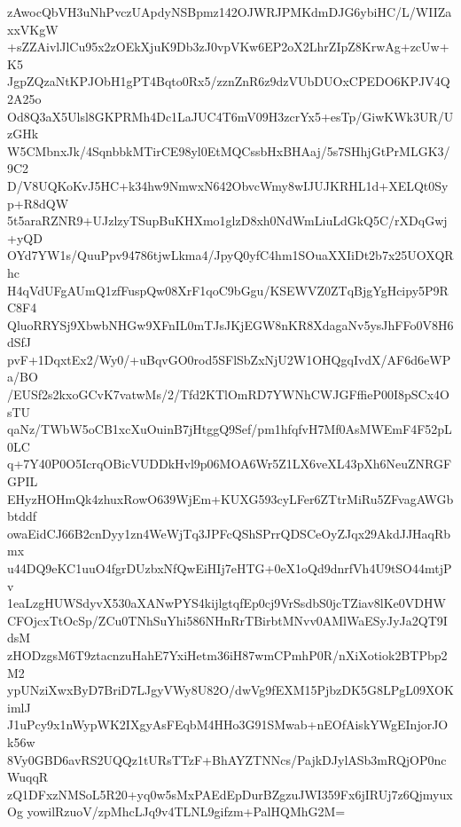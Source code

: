 zAwocQbVH3uNhPvczUApdyNSBpmz142OJWRJPMKdmDJG6ybiHC/L/WIIZaxxVKgW
+sZZAivlJlCu95x2zOEkXjuK9Db3zJ0vpVKw6EP2oX2LhrZIpZ8KrwAg+zcUw+K5
JgpZQzaNtKPJObH1gPT4Bqto0Rx5/zznZnR6z9dzVUbDUOxCPEDO6KPJV4Q2A25o
Od8Q3aX5Ulsl8GKPRMh4Dc1LaJUC4T6mV09H3zcrYx5+esTp/GiwKWk3UR/UzGHk
W5CMbnxJk/4SqnbbkMTirCE98yl0EtMQCssbHxBHAaj/5s7SHhjGtPrMLGK3/9C2
D/V8UQKoKvJ5HC+k34hw9NmwxN642ObvcWmy8wIJUJKRHL1d+XELQt0Syp+R8dQW
5t5araRZNR9+UJzlzyTSupBuKHXmo1glzD8xh0NdWmLiuLdGkQ5C/rXDqGwj+yQD
OYd7YW1s/QuuPpv94786tjwLkma4/JpyQ0yfC4hm1SOuaXXIiDt2b7x25UOXQRhc
H4qVdUFgAUmQ1zfFuspQw08XrF1qoC9bGgu/KSEWVZ0ZTqBjgYgHcipy5P9RC8F4
QluoRRYSj9XbwbNHGw9XFnIL0mTJsJKjEGW8nKR8XdagaNv5ysJhFFo0V8H6dSfJ
pvF+1DqxtEx2/Wy0/+uBqvGO0rod5SFlSbZxNjU2W1OHQgqIvdX/AF6d6eWPa/BO
/EUSf2s2kxoGCvK7vatwMs/2/Tfd2KTlOmRD7YWNhCWJGFffieP00I8pSCx4OsTU
qaNz/TWbW5oCB1xcXuOuinB7jHtggQ9Sef/pm1hfqfvH7Mf0AsMWEmF4F52pL0LC
q+7Y40P0O5IcrqOBicVUDDkHvl9p06MOA6Wr5Z1LX6veXL43pXh6NeuZNRGFGPIL
EHyzHOHmQk4zhuxRowO639WjEm+KUXG593cyLFer6ZTtrMiRu5ZFvagAWGbbtddf
owaEidCJ66B2cnDyy1zn4WeWjTq3JPFcQShSPrrQDSCeOyZJqx29AkdJJHaqRbmx
u44DQ9eKC1uuO4fgrDUzbxNfQwEiHIj7eHTG+0eX1oQd9dnrfVh4U9tSO44mtjPv
1eaLzgHUWSdyvX530aXANwPYS4kijlgtqfEp0cj9VrSsdbS0jcTZiav8lKe0VDHW
CFOjcxTtOcSp/ZCu0TNhSuYhi586NHnRrTBirbtMNvv0AMlWaESyJyJa2QT9IdsM
zHODzgsM6T9ztacnzuHahE7YxiHetm36iH87wmCPmhP0R/nXiXotiok2BTPbp2M2
ypUNziXwxByD7BriD7LJgyVWy8U82O/dwVg9fEXM15PjbzDK5G8LPgL09XOKimlJ
J1uPcy9x1nWypWK2IXgyAsFEqbM4HHo3G91SMwab+nEOfAiskYWgEInjorJOk56w
8Vy0GBD6avRS2UQQz1tURsTTzF+BhAYZTNNcs/PajkDJylASb3mRQjOP0ncWuqqR
zQ1DFxzNMSoL5R20+yq0w5sMxPAEdEpDurBZgzuJWI359Fx6jIRUj7z6QjmyuxOg
yowilRzuoV/zpMhcLJq9v4TLNL9gifzm+PalHQMhG2M=
